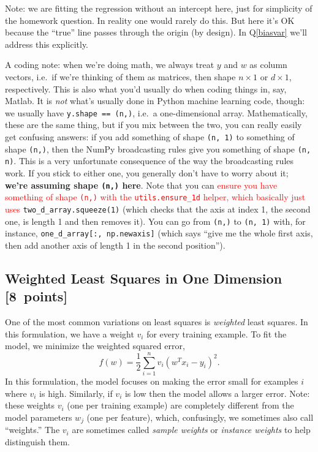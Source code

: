 \documentclass{article}
\newcommand{\red}[1]{\textcolor{red}{#1}}
\let\update\red
\newcommand\pts[1]{\textcolor{pointscolour}{[#1~points]}}
\begin{document}
Note: we are fitting the regression without an intercept here, just for simplicity of the homework question.
In reality one would rarely do this. But here it's OK because the ``true'' line
passes through the origin (by design). In Q\ref{biasvar} we'll address this explicitly.

A coding note:
when we're doing math, we always treat $y$ and $w$ as column vectors,
i.e.\ if we're thinking of them as matrices, then shape $n \times 1$ or $d \times 1$, respectively.
This is also what you'd usually do when coding things in, say, Matlab.
It is \emph{not} what's usually done in Python machine learning code, though:
we usually have \verb|y.shape == (n,)|, i.e.\ a one-dimensional array.
Mathematically, these are the same thing, but if you mix between the two,
you can really easily get confusing answers:
if you add something of shape \texttt{(n, 1)} to something of shape \texttt{(n,)},
then the NumPy broadcasting rules give you something of shape \texttt{(n, n)}.
This is a very unfortunate consequence of the way the broadcasting rules work.
If you stick to either one, you generally don't have to worry about it;
\textbf{we're assuming shape \texttt{(n,)} here}.
Note that you can
\update{ensure you have something of shape \texttt{(n,)} with the \texttt{utils.ensure\_1d} helper, which basically just uses}
\texttt{two\_d\_array.squeeze(1)}
(which checks that the axis at index 1, the second one, is length 1 and then removes it).
You can go from \texttt{(n,)} to \texttt{(n, 1)} with, for instance, \texttt{one\_d\_array[:, np.newaxis]}
(which says ``give me the whole first axis, then add another axis of length 1 in the second position'').

\subsection{Weighted Least Squares in One Dimension \pts{8}}

One of the most common variations on least squares is \emph{weighted} least squares. In this formulation, we have a weight $v_i$ for every training example. To fit the model, we minimize the weighted squared error,
\[
f(w) =  \frac{1}{2}\sum_{i=1}^n v_i(w^Tx_i - y_i)^2.
\]
In this formulation, the model focuses on making the error small for examples $i$ where $v_i$ is high. Similarly, if $v_i$ is low then the model allows a larger error. Note: these weights $v_i$ (one per training example) are completely different from the model parameters $w_j$ (one per feature), which, confusingly, we sometimes also call ``weights.'' The $v_i$ are sometimes called \emph{sample weights} or \emph{instance weights} to help distinguish them.
\end{document}
